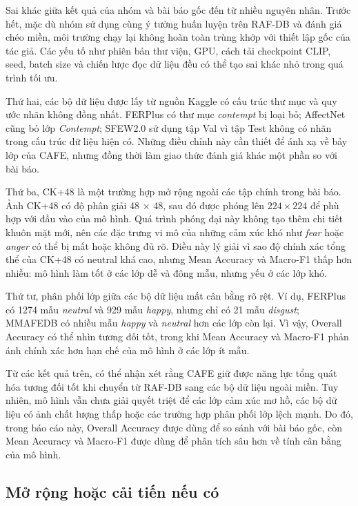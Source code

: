 Sai khác giữa kết quả của nhóm và bài báo gốc đến từ nhiều nguyên nhân. Trước hết, mặc dù nhóm sử dụng cùng ý tưởng huấn luyện trên RAF-DB và đánh giá chéo miền, môi trường chạy lại không hoàn toàn trùng khớp với thiết lập gốc của tác giả. Các yếu tố như phiên bản thư viện, GPU, cách tải checkpoint CLIP, seed, batch size và chiến lược đọc dữ liệu đều có thể tạo sai khác nhỏ trong quá trình tối ưu.

Thứ hai, các bộ dữ liệu được lấy từ nguồn Kaggle có cấu trúc thư mục và quy ước nhãn không đồng nhất. FERPlus có thư mục \textit{contempt} bị loại bỏ; AffectNet cũng bỏ lớp \textit{Contempt}; SFEW2.0 sử dụng tập Val vì tập Test không có nhãn trong cấu trúc dữ liệu hiện có. Những điều chỉnh này cần thiết để ánh xạ về bảy lớp của CAFE, nhưng đồng thời làm giao thức đánh giá khác một phần so với bài báo.

Thứ ba, CK+48 là một trường hợp mở rộng ngoài các tập chính trong bài báo. Ảnh CK+48 có độ phân giải 48 $\times$ 48, sau đó được phóng lên $224 \times 224$ để phù hợp với đầu vào của mô hình. Quá trình phóng đại này không tạo thêm chi tiết khuôn mặt mới, nên các đặc trưng vi mô của những cảm xúc khó như \textit{fear} hoặc \textit{anger} có thể bị mất hoặc không đủ rõ. Điều này lý giải vì sao độ chính xác tổng thể của CK+48 có neutral khá cao, nhưng Mean Accuracy và Macro-F1 thấp hơn nhiều: mô hình làm tốt ở các lớp dễ và đông mẫu, nhưng yếu ở các lớp khó.

Thứ tư, phân phối lớp giữa các bộ dữ liệu mất cân bằng rõ rệt. Ví dụ, FERPlus có 1274 mẫu \textit{neutral} và 929 mẫu \textit{happy}, nhưng chỉ có 21 mẫu \textit{disgust}; MMAFEDB có nhiều mẫu \textit{happy} và \textit{neutral} hơn các lớp còn lại. Vì vậy, Overall Accuracy có thể nhìn tương đối tốt, trong khi Mean Accuracy và Macro-F1 phản ánh chính xác hơn hạn chế của mô hình ở các lớp ít mẫu.

Từ các kết quả trên, có thể nhận xét rằng CAFE giữ được năng lực tổng quát hóa tương đối tốt khi chuyển từ RAF-DB sang các bộ dữ liệu ngoài miền. Tuy nhiên, mô hình vẫn chưa giải quyết triệt để các lớp cảm xúc mơ hồ, các bộ dữ liệu có ảnh chất lượng thấp hoặc các trường hợp phân phối lớp lệch mạnh. Do đó, trong báo cáo này, Overall Accuracy được dùng để so sánh với bài báo gốc, còn Mean Accuracy và Macro-F1 được dùng để phân tích sâu hơn về tính cân bằng của mô hình.
\subsection{Mở rộng hoặc cải tiến nếu có}



